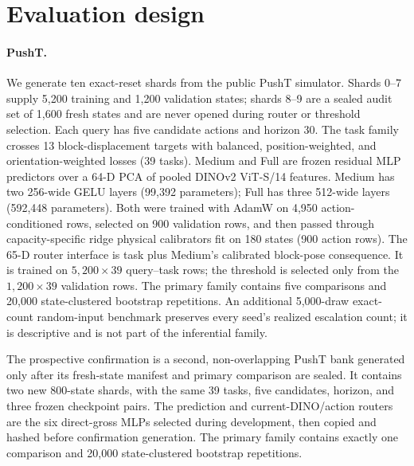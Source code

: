 \documentclass[10pt]{article}
\theoremstyle{definition}
\theoremstyle{remark}
\newcommand{\pusht}{PushT}
\begin{document}
\section{Evaluation design}
\label{sec:experiments}

\begin{table}[t]
  \centering
  \caption{All evaluations ask the same routing question.  The prospective
  PushT bank tests a stronger current-DINO/action control, while controlled
  PyBullet supplies a different physical mechanism.  The predictors remain
  related DINO-style families rather than distinct world-model paradigms.}
  \label{tab:env}
  \small
  
\end{table}

\paragraph{\pusht{}.}
We generate ten exact-reset shards from the public \pusht{} simulator.  Shards
0--7 supply 5,200 training and 1,200 validation states; shards 8--9 are a
sealed audit set of 1,600 fresh states and are never opened during router or
threshold selection.  Each query has five candidate actions and horizon 30.
The task family crosses 13 block-displacement targets with balanced,
position-weighted, and orientation-weighted losses (39 tasks).  Medium and
Full are frozen residual MLP predictors over a 64-D PCA of pooled DINOv2
ViT-S/14 features.  Medium has two 256-wide GELU layers (99,392 parameters);
Full has three 512-wide layers (592,448 parameters).  Both were trained with
AdamW on 4,950 action-conditioned rows, selected on 900 validation rows, and
then passed through capacity-specific ridge physical calibrators fit on 180
states (900 action rows).  The 65-D router interface is task plus Medium's
calibrated block-pose consequence.  It is trained on
$5{,}200\times39$ query--task rows; the threshold is selected only from the
$1{,}200\times39$ validation rows.  The primary family contains five
comparisons and 20,000 state-clustered bootstrap repetitions.  An additional
5,000-draw exact-count random-input benchmark preserves every seed's realized
escalation count; it is descriptive and is not part of the inferential family.

The prospective confirmation is a second, non-overlapping PushT bank generated only after its
fresh-state manifest and primary comparison are sealed.  It contains two new
800-state shards, with the same 39 tasks, five candidates, horizon, and three
frozen checkpoint pairs.  The prediction and current-DINO/action routers are
the six direct-gross MLPs selected during development, then copied and hashed
before confirmation generation.  The primary family contains exactly one comparison
and 20,000 state-clustered bootstrap repetitions.
\end{document}
